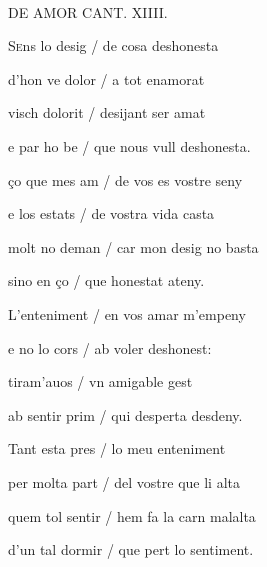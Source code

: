 \documentclass[12pt]{article}
\renewcommand{\espaiAbansEtiquetaPoema}{\vspace{0ex}}
\begin{document}
\begin{estrofa}

\espaiAbansEtiquetaPoema

\\

\begin{rubrica}

DE AMOR CANT. XIIII.

\end{rubrica}

\end{estrofa}


\begin{estrofa}

 S\textsc{e}ns lo desig / de cosa deshonesta

 d'hon ve dolor / a tot enamorat

 visch dolorit / desijant ser amat

 e par ho be / que nous vull deshonesta.

 \c{c}o que mes am / de vos es vostre seny

 e los estats / de vostra vida casta

 molt no deman / car mon desig no basta

 sino en \c{c}o / que honestat ateny.

\end{estrofa}



\begin{estrofa}

 L'enteniment / en vos amar m'empeny

 e no lo cors / ab voler deshonest:

 tiram'auos / vn amigable gest

 ab sentir prim / qui desperta desdeny.

 Tant esta pres / lo meu enteniment

 per molta part / del vostre que li alta

 quem tol sentir / hem fa la carn malalta

 d'un tal dormir / que pert lo sentiment.

\end{estrofa}
\end{document}
